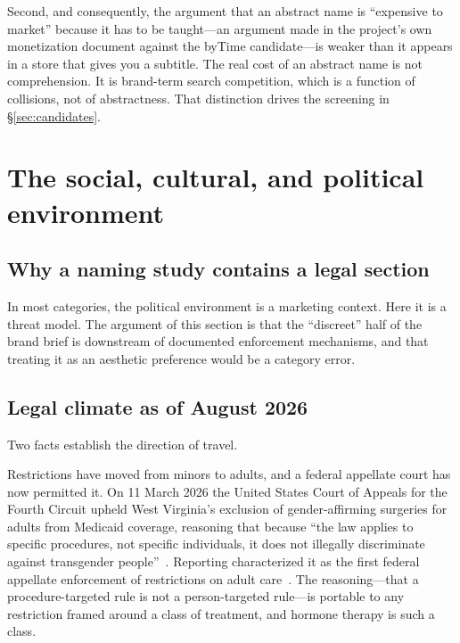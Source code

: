 \documentclass[11pt,a4paper]{article}
\begin{document}
Second, and consequently, the argument that an abstract name is
``expensive to market'' because it has to be taught---an argument made
in the project's own monetization document against the byTime
candidate---is weaker than it appears in a store that gives you a
subtitle. The real cost of an abstract name is not comprehension. It is
brand-term search competition, which is a function of collisions, not
of abstractness. That distinction drives the screening in
\S\ref{sec:candidates}.

\section{The social, cultural, and political environment}
\label{sec:sociopolitical}

\subsection{Why a naming study contains a legal section}

In most categories, the political environment is a marketing context.
Here it is a threat model. The argument of this section is that the
``discreet'' half of the brand brief is downstream of documented
enforcement mechanisms, and that treating it as an aesthetic preference
would be a category error.

\subsection{Legal climate as of August 2026}
\label{sec:legal}

Two facts establish the direction of travel.

Restrictions have moved from minors to adults, and a federal appellate
court has now permitted it. On 11 March 2026 the United States Court of
Appeals for the Fourth Circuit upheld West Virginia's exclusion of
gender-affirming surgeries for adults from Medicaid coverage, reasoning
that because ``the law applies to specific procedures, not specific
individuals, it does not illegally discriminate against transgender
people''~\cite{advocate4th}. Reporting characterized it as the first
federal appellate enforcement of restrictions on adult
care~\cite{advocate4th}. The reasoning---that a procedure-targeted rule
is not a person-targeted rule---is portable to any restriction framed
around a class of treatment, and hormone therapy is such a class.
\end{document}

